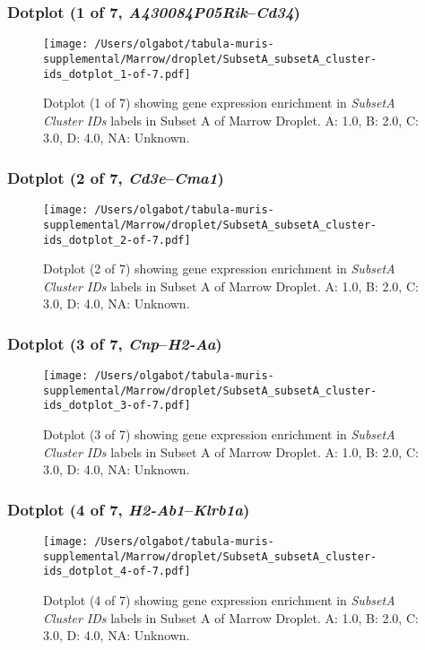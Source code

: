 \clearpage

\subsubsection{Dotplot (1 of 7, \emph{A430084P05Rik}--\emph{Cd34})}
\begin{figure}[h]
\centering
\texttt{[image: /Users/olgabot/tabula-muris-supplemental/Marrow/droplet/SubsetA\_subsetA\_cluster-ids\_dotplot\_1-of-7.pdf]}

\caption{ Dotplot (1 of 7)  showing gene expression enrichment in \emph{SubsetA Cluster IDs} labels in Subset A of Marrow Droplet. A: 1.0, B: 2.0, C: 3.0, D: 4.0, NA: Unknown.}
\end{figure}


\clearpage

\subsubsection{Dotplot (2 of 7, \emph{Cd3e}--\emph{Cma1})}
\begin{figure}[h]
\centering
\texttt{[image: /Users/olgabot/tabula-muris-supplemental/Marrow/droplet/SubsetA\_subsetA\_cluster-ids\_dotplot\_2-of-7.pdf]}

\caption{ Dotplot (2 of 7)  showing gene expression enrichment in \emph{SubsetA Cluster IDs} labels in Subset A of Marrow Droplet. A: 1.0, B: 2.0, C: 3.0, D: 4.0, NA: Unknown.}
\end{figure}


\clearpage

\subsubsection{Dotplot (3 of 7, \emph{Cnp}--\emph{H2-Aa})}
\begin{figure}[h]
\centering
\texttt{[image: /Users/olgabot/tabula-muris-supplemental/Marrow/droplet/SubsetA\_subsetA\_cluster-ids\_dotplot\_3-of-7.pdf]}

\caption{ Dotplot (3 of 7)  showing gene expression enrichment in \emph{SubsetA Cluster IDs} labels in Subset A of Marrow Droplet. A: 1.0, B: 2.0, C: 3.0, D: 4.0, NA: Unknown.}
\end{figure}


\clearpage

\subsubsection{Dotplot (4 of 7, \emph{H2-Ab1}--\emph{Klrb1a})}
\begin{figure}[h]
\centering
\texttt{[image: /Users/olgabot/tabula-muris-supplemental/Marrow/droplet/SubsetA\_subsetA\_cluster-ids\_dotplot\_4-of-7.pdf]}

\caption{ Dotplot (4 of 7)  showing gene expression enrichment in \emph{SubsetA Cluster IDs} labels in Subset A of Marrow Droplet. A: 1.0, B: 2.0, C: 3.0, D: 4.0, NA: Unknown.}
\end{figure}


